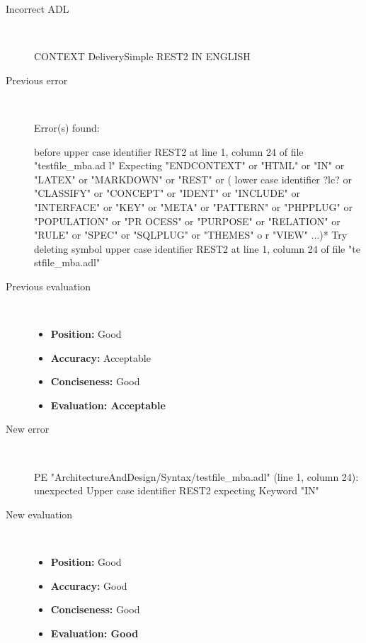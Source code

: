\hrulefill

\begin{description}
  \item[Incorrect ADL]~\\
\begin{adl}
CONTEXT DeliverySimple REST2 IN ENGLISH \end{adl}
  \item[Previous error]~\\
\begin{haskell}
Error(s) found:

before upper case identifier REST2 at line 1, column 24 of file "testfile_mba.ad
l"
Expecting "ENDCONTEXT" or "HTML" or "IN" or "LATEX" or "MARKDOWN" or "REST" or (
lower case identifier ?lc? or "CLASSIFY" or "CONCEPT" or "IDENT" or "INCLUDE" or
 "INTERFACE" or "KEY" or "META" or "PATTERN" or "PHPPLUG" or "POPULATION" or "PR
OCESS" or "PURPOSE" or "RELATION" or "RULE" or "SPEC" or "SQLPLUG" or "THEMES" o
r "VIEW" ...)*
Try deleting symbol upper case identifier REST2 at line 1, column 24 of file "te
stfile_mba.adl"
\end{haskell}
  \item[Previous evaluation]~\\
    \begin{itemize}
    \item \textbf{Position:} Good
    \item \textbf{Accuracy:} Acceptable
    \item \textbf{Conciseness:} Good
    \item \textbf{Evaluation: Acceptable}
    \end{itemize}
  \item[New error]~\\
\begin{haskell}
PE "ArchitectureAndDesign/Syntax/testfile_mba.adl" (line 1, column 24):
unexpected Upper case identifier REST2
expecting Keyword "IN"
\end{haskell}
  \item[New evaluation]~\\
    \begin{itemize}
    \item \textbf{Position:} Good
    \item \textbf{Accuracy:} Good
    \item \textbf{Conciseness:} Good
    \item \textbf{Evaluation: Good}
    \end{itemize}
  \end{description}

